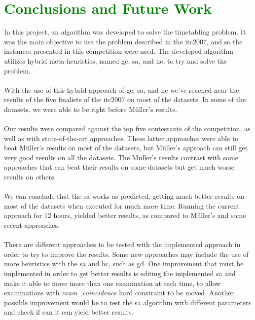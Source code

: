 \chapter{\textcolor{green}{Conclusions and Future Work}}
\label{chap:FutureWork}

In this project, an algorithm was developed to solve the timetabling problem. It was the main objective to use the problem described in the \gls{itc2007}, and so the instances presented in this competition were used. The developed algorithm utilizes hybrid meta-heuristics, named \gls{gc}, \gls{sa}, and \gls{hc}, to try and solve the problem.\\
\\
With the use of this hybrid approach of \gls{gc}, \gls{sa}, and \gls{hc} we've reached near the results of the five finalists of the \gls{itc2007} on most of the datasets. In some of the datasets, we were able to be right before M\"{u}ller's results.\\
\\
Our results were compared against the top five contestants of the competition, as well as with state-of-the-art approaches. These latter approaches were able to beat M\"{u}ller's results on most of the datasets, but M\"{u}ller's approach can still get very good results on all the datasets. The Muller's results contrast with some approaches that can beat their results on some datasets but get much worse results on others.\\
\\
We can conclude that the \gls{sa} works as predicted, getting much better results on most of the datasets when executed for much more time. Running the current approach for 12 hours, yielded better results, as compared to M\"{u}ller's and some recent approaches.\\
\\
There are different approaches to be tested with the implemented approach in order to try to improve the results. Some new approaches may include the use of more heuristics with the \gls{sa} and \gls{hc}, such as \gls{gd}. One improvement that must be implemented in order to get better results is editing the implemented \gls{sa} and make it able to move more than one examination at each time, to allow examinations with \textit{exam\_coincidence} hard constraint to be moved. Another possible improvement would be to test the \gls{sa} algorithm with different parameters and check if can it can yield better results.